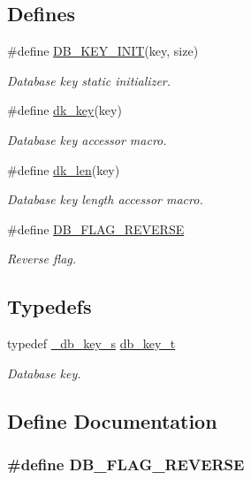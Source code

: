 \subsection*{Defines}
\begin{CompactItemize}
\item 
\#define \hyperlink{group__dbprim_ga1}{DB\_\-KEY\_\-INIT}(key, size)
\begin{CompactList}\small\item\em Database key static initializer. \item\end{CompactList}\item 
\#define \hyperlink{group__dbprim_ga2}{dk\_\-key}(key)
\begin{CompactList}\small\item\em Database key accessor macro. \item\end{CompactList}\item 
\#define \hyperlink{group__dbprim_ga3}{dk\_\-len}(key)
\begin{CompactList}\small\item\em Database key length accessor macro. \item\end{CompactList}\item 
\#define \hyperlink{group__dbprim_ga4}{DB\_\-FLAG\_\-REVERSE}
\begin{CompactList}\small\item\em Reverse flag. \item\end{CompactList}\end{CompactItemize}
\subsection*{Typedefs}
\begin{CompactItemize}
\item 
typedef \hyperlink{struct__db__key__s}{\_\-db\_\-key\_\-s} \hyperlink{group__dbprim_ga0}{db\_\-key\_\-t}
\begin{CompactList}\small\item\em Database key. \item\end{CompactList}\end{CompactItemize}


\subsection{Define Documentation}
\hypertarget{group__dbprim_ga4}{
\subsubsection[DB\_\-FLAG\_\-REVERSE]{\setlength{\rightskip}{0pt plus 5cm}\#define DB\_\-FLAG\_\-REVERSE}}
\label{group__dbprim_ga4}


